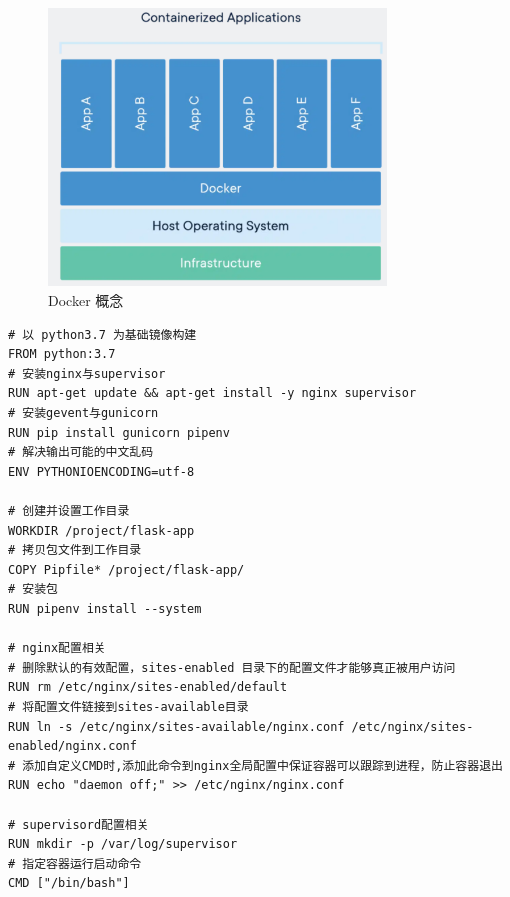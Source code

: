 \begin{figure}[htb]
\centering 
\includegraphics[width=0.80\textwidth]{img/ch5m3.png} 
\caption{Docker 概念}
\label{Test}
\end{figure}


\begin{Verbatim}
# 以 python3.7 为基础镜像构建
FROM python:3.7
# 安装nginx与supervisor
RUN apt-get update && apt-get install -y nginx supervisor
# 安装gevent与gunicorn
RUN pip install gunicorn pipenv
# 解决输出可能的中文乱码
ENV PYTHONIOENCODING=utf-8

# 创建并设置工作目录
WORKDIR /project/flask-app
# 拷贝包文件到工作目录
COPY Pipfile* /project/flask-app/
# 安装包
RUN pipenv install --system

# nginx配置相关
# 删除默认的有效配置，sites-enabled 目录下的配置文件才能够真正被用户访问
RUN rm /etc/nginx/sites-enabled/default
# 将配置文件链接到sites-available目录
RUN ln -s /etc/nginx/sites-available/nginx.conf /etc/nginx/sites-enabled/nginx.conf
# 添加自定义CMD时,添加此命令到nginx全局配置中保证容器可以跟踪到进程，防止容器退出
RUN echo "daemon off;" >> /etc/nginx/nginx.conf

# supervisord配置相关
RUN mkdir -p /var/log/supervisor
# 指定容器运行启动命令
CMD ["/bin/bash"]
\end{Verbatim}
